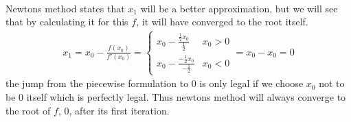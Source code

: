 \documentclass{article}
\begin{document}
\begin{itemize}
\begin{itemize}
\begin{equation}
\begin{aligned}
        \end{aligned}
        \end{equation}
        Newtons method states that $x_1$ will be a better approximation, but we will see that by calculating it for this $f$, it will have converged to the root itself.
        \begin{equation}
        \begin{aligned}
           x_1 = x_0 - \frac{f(x_0)}{f'(x_0)} = \begin{cases} x_0 - \frac{\frac{1}{2}x_0}{\frac{1}{2}} & x_0 > 0 \\ x_0 - \frac{-\frac{1}{2}x_0}{-\frac{1}{2}} & x_0 < 0 \end{cases} = x_0 - x_0 = 0 
        \end{aligned}
        \end{equation}
        the jump from the piecewise formulation to 0 is only legal if we choose $x_0$ not to be 0 itself which is perfectly legal. Thus newtons method will always converge to the root of $f$, 0, after its first iteration. 
    \end{itemize}
\end{itemize}

\newpage
\end{document}
